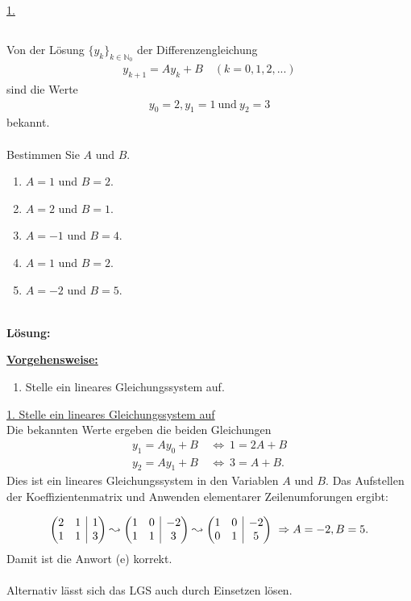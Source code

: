 \underline{1. }\\
\newpage

\subsection*{}
Von der Lösung $ \{y_k\}_{k \in \mathbb{N}_0} $ der Differenzengleichung
\begin{align*}
	y_{k+1} = A y_k + B \quad (k = 0,1,2,...)
\end{align*}
sind die Werte
\begin{align*}
	y_0 = 2, y_1 = 1 \ \textrm{und} \ y_2 = 3
\end{align*}
bekannt.\\
\\
Bestimmen Sie $ A $ und $ B $.
\renewcommand{\labelenumi}{(\alph{enumi})}
\begin{enumerate}
	\item
	$ A=1 $ und $ B=2 $.
	\item
	$ A=2 $ und $ B=1 $.	
	\item 
	$ A=-1 $ und $ B=4 $.
	\item
	$ A=1 $ und $ B=2 $.
	\item
	$ A=-2 $ und $ B=5 $.
\end{enumerate}
\ \\
\textbf{Lösung:}
\begin{mdframed}
\underline{\textbf{Vorgehensweise:}}
\renewcommand{\labelenumi}{\theenumi.}
\begin{enumerate}
\item Stelle ein lineares Gleichungssystem auf.
\end{enumerate}
\end{mdframed}

\underline{1. Stelle ein lineares Gleichungssystem auf}\\
Die bekannten Werte ergeben die beiden Gleichungen
\begin{align*}
	 y_1 = A y_0 + B 
	\ &\Leftrightarrow \
	1 = 2 A + B\\
	y_2 = A y_1 + B 
	\ &\Leftrightarrow \
	3 = A + B.
\end{align*}
Dies ist ein lineares Gleichungssystem in den Variablen $ A $ und $ B $. Das Aufstellen der Koeffizientenmatrix und Anwenden elementarer Zeilenumforungen ergibt:

\begin{align*}
	\begin{pmatrix}
		2 & 1 & \BAR & 1\\
		1 & 1 & \BAR & 3
	\end{pmatrix}
	\leadsto
	\begin{pmatrix}
		1 & 0 & \BAR & -2\\
		1 & 1 & \BAR & 3
	\end{pmatrix}
	\leadsto
	\begin{pmatrix}
		1 & 0 & \BAR & -2\\
		0 & 1 & \BAR & 5
	\end{pmatrix}
	\ \Rightarrow A = -2, B = 5.
\end{align*}
Damit ist die Anwort (e) korrekt.\\
\\
Alternativ lässt sich das LGS auch durch Einsetzen lösen.
\newpage

